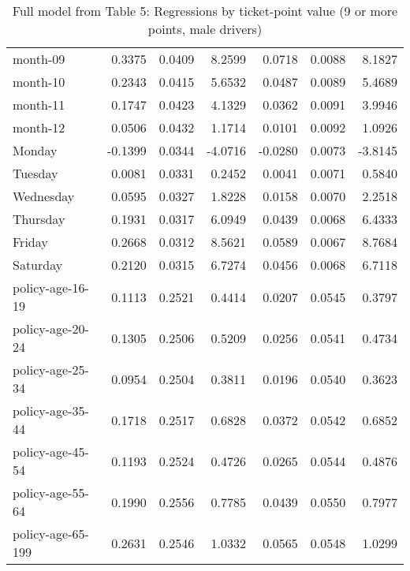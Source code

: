 \documentclass[10pt]{article}
\begin{document}
\begin{table}[ht]
\begin{tabular}{lrrrrrr}
  month-09 & 0.3375 & 0.0409 & 8.2599 & 0.0718 & 0.0088 & 8.1827 \\ 
  month-10 & 0.2343 & 0.0415 & 5.6532 & 0.0487 & 0.0089 & 5.4689 \\ 
  month-11 & 0.1747 & 0.0423 & 4.1329 & 0.0362 & 0.0091 & 3.9946 \\ 
  month-12 & 0.0506 & 0.0432 & 1.1714 & 0.0101 & 0.0092 & 1.0926 \\ 
  Monday & -0.1399 & 0.0344 & -4.0716 & -0.0280 & 0.0073 & -3.8145 \\ 
  Tuesday & 0.0081 & 0.0331 & 0.2452 & 0.0041 & 0.0071 & 0.5840 \\ 
  Wednesday & 0.0595 & 0.0327 & 1.8228 & 0.0158 & 0.0070 & 2.2518 \\ 
  Thursday & 0.1931 & 0.0317 & 6.0949 & 0.0439 & 0.0068 & 6.4333 \\ 
  Friday & 0.2668 & 0.0312 & 8.5621 & 0.0589 & 0.0067 & 8.7684 \\ 
  Saturday & 0.2120 & 0.0315 & 6.7274 & 0.0456 & 0.0068 & 6.7118 \\ 
  policy-age-16-19 & 0.1113 & 0.2521 & 0.4414 & 0.0207 & 0.0545 & 0.3797 \\ 
  policy-age-20-24 & 0.1305 & 0.2506 & 0.5209 & 0.0256 & 0.0541 & 0.4734 \\ 
  policy-age-25-34 & 0.0954 & 0.2504 & 0.3811 & 0.0196 & 0.0540 & 0.3623 \\ 
  policy-age-35-44 & 0.1718 & 0.2517 & 0.6828 & 0.0372 & 0.0542 & 0.6852 \\ 
  policy-age-45-54 & 0.1193 & 0.2524 & 0.4726 & 0.0265 & 0.0544 & 0.4876 \\ 
  policy-age-55-64 & 0.1990 & 0.2556 & 0.7785 & 0.0439 & 0.0550 & 0.7977 \\ 
  policy-age-65-199 & 0.2631 & 0.2546 & 1.0332 & 0.0565 & 0.0548 & 1.0299 \\ 
   \hline
\end{tabular}
\caption{Full model from Table 5: Regressions by ticket-point value (9 or more points, male drivers)} 
\label{tab_5_9plus_pts_M}
\end{table}


\clearpage
\pagebreak



\end{document}
